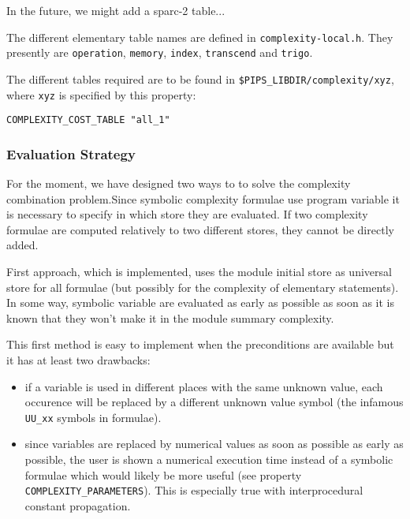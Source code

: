 In the future, we might add a sparc-2 table...

The different elementary table names are defined in
\verb+complexity-local.h+. They presently are \verb+operation+, 
\verb+memory+, \verb+index+, \verb+transcend+
and \verb+trigo+.

The different tables required are to be found in
\verb+$PIPS_LIBDIR/complexity/xyz+,
where \verb+xyz+ is specified by this property:

\begin{verbatim}
COMPLEXITY_COST_TABLE "all_1"
\end{verbatim}

\subsubsection{Evaluation Strategy}

For the moment, we have designed two ways to to solve the complexity
combination problem.Since symbolic complexity formulae use program
variable it is necessary to specify in which store they are
evaluated. If two complexity formulae are computed relatively to two
different stores, they cannot be directly added.

First approach, which is implemented, uses the module initial store as
universal store for all formulae (but possibly for the complexity of
elementary statements).
In some way, symbolic variable are evaluated as early as possible as
soon as it is known that they won't make it in the module summary
complexity.

This first method is easy to implement when the preconditions are available
but it has at least two drawbacks:

\begin{itemize}

  \item if a variable is used in different places with the same unknown
value, each occurence will be replaced by a different unknown value
symbol (the infamous \verb+UU_xx+ symbols in formulae).

  \item since variables are replaced by numerical values as soon as
possible as early as possible, the user is shown a numerical execution
time instead of a symbolic formulae which would likely be more useful
(see property \verb+COMPLEXITY_PARAMETERS+). This is especially true
with interprocedural constant propagation.

\end{itemize}


